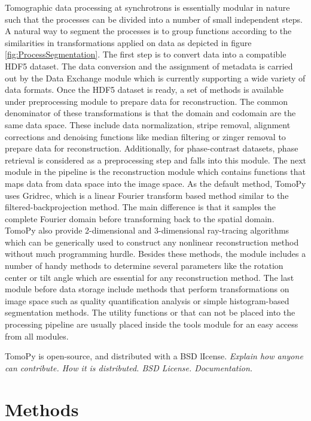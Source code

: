 \documentclass[pdf]{iucr}              %
\begin{document}
Tomographic data processing at synchrotrons is essentially modular in nature such that the processes can be divided into a number of small independent steps. A natural way to segment the processes is to group functions according to the similarities in transformations applied on data as depicted in figure \ref{fig:ProcessSegmentation}. The first step is to convert data into a compatible HDF5 dataset. The data conversion and the assignment of metadata is carried out by the Data Exchange module which is currently supporting a wide variety of data formats. Once the HDF5 dataset is ready, a set of methods is available under preprocessing module to prepare data for reconstruction. The common denominator of these transformations is that the domain and codomain are the same data space. These include data normalization, stripe removal, alignment corrections and denoising functions like median filtering or zinger removal to prepare data for reconstruction. Additionally, for phase-contrast datasets, phase retrieval is considered as a preprocessing step and falls into this module. The next module in the pipeline is the reconstruction module which contains functions that maps data from data space into the image space. As the default method, TomoPy uses Gridrec, which is a linear Fourier transform based method similar to the filtered-backprojection method. The main difference is that it samples the complete Fourier domain before transforming back to the spatial domain. TomoPy also provide 2-dimensional and 3-dimensional ray-tracing algorithms which can be generically used to construct any nonlinear reconstruction method without much programming hurdle. Besides these methods, the module includes a number of handy methods to determine several parameters like the rotation center or tilt angle which are essential for any reconstruction method. The last module before data storage include methods that perform transformations on image space such as quality quantification analysis or simple histogram-based segmentation methods.  The utility functions or that can not be placed into the processing pipeline are usually placed inside the tools module for an easy access from all modules. 

TomoPy is open-source, and distributed with a BSD lIcense.
{\it Explain how anyone can contribute. How it is distributed. BSD License. Documentation.}

\section{Methods} 
\end{document}

